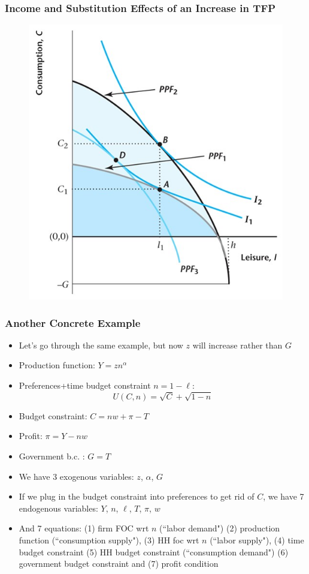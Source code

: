 \documentclass{beamer}
\begin{document}
\begin{frame}
\frametitle[alignment=center]{Income and Substitution Effects of an Increase in TFP}
\begin{figure}
\centering
\includegraphics[scale=0.5]{Figures/W_Fig_5pt10.png}
\end{figure}
\end{frame}


\begin{frame}
\frametitle[alignment=center]{Another Concrete Example}
\begin{itemize}
\item Let's go through the same example, but now $z$ will increase rather than $G$
\item Production function:  $Y=zn^{\alpha}$
\bigskip
\item Preferences+time budget constraint  $n=1-\ell$:  
$$U(C,n)=\sqrt{C}+\sqrt{1-n}$$
\item Budget constraint:  $C=nw+\pi-T$
\bigskip
\item Profit:  $\pi=Y-nw$
\bigskip
\item Government b.c. : $G=T$
\bigskip
\item We have 3 exogenous variables: $z$, $\alpha$, $G$
\bigskip
\item If we plug in the budget constraint into preferences to get rid of $C$, we have 7 endogenous variables: $Y$, $n$, $\ell$, $T$, $\pi$, $w$
\bigskip
\item And 7 equations:  (1) firm FOC wrt $n$ (``labor demand") (2) production function (``consumption supply"), (3) HH foc wrt $n$ (``labor supply"), (4) time budget constraint (5) HH budget constraint (``consumption demand") (6) government budget constraint and (7) profit condition
\end{itemize}
\end{frame}
\end{document}
